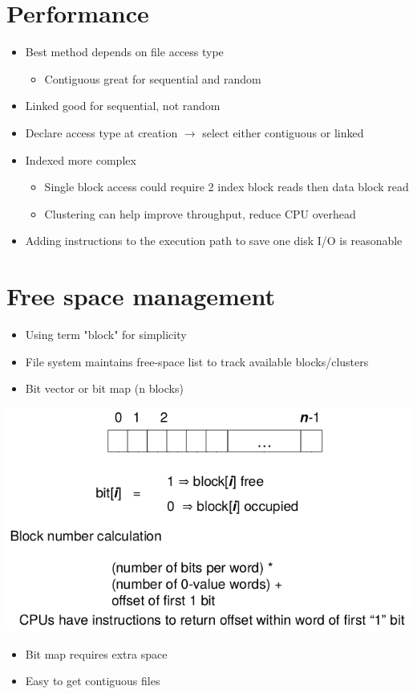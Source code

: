 \documentclass{article}[18pt]
\begin{document}
\section{Performance}
\begin{itemize}
	\item Best method depends on file access type
	\begin{itemize}
		\item Contiguous great for sequential and random
	\end{itemize}
	\item Linked good for sequential, not random
	\item Declare access type at creation $\rightarrow$ select either contiguous or linked
	\item Indexed more complex
	\begin{itemize}
		\item Single block access could require 2 index block reads then data block read
		\item Clustering can help improve throughput, reduce CPU overhead
	\end{itemize}
	\item Adding instructions to the execution path to save one disk I/O is reasonable
\end{itemize}
\section{Free space management}
\begin{itemize}
	\item Using term "block" for simplicity
	\item File system maintains free-space list to track available blocks/clusters
	\item Bit vector or bit map (n blocks)
\end{itemize}
\begin{center}
	\includegraphics[scale=0.7]{"Free Space"}
\end{center}
\begin{itemize}
	\item Bit map requires extra space
	\item Easy to get contiguous files
\end{itemize}
\end{document}

